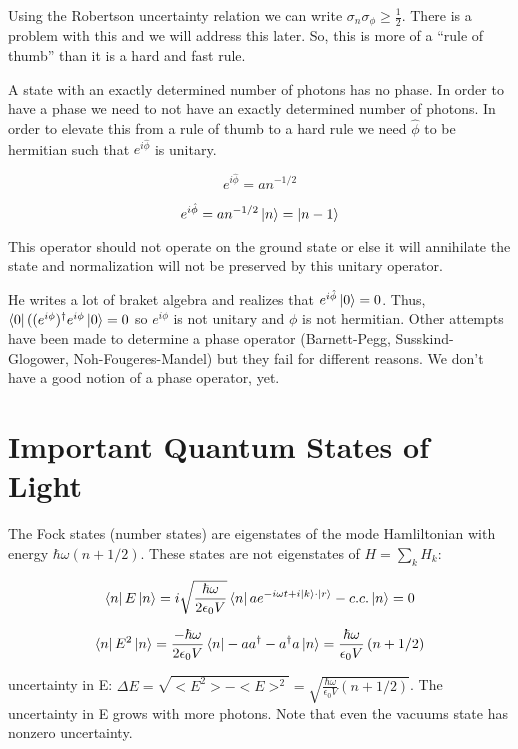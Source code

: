 \documentclass{article}
\begin{document}
Using the Robertson uncertainty relation we can write $\sigma_n \sigma_\phi \ge
\frac{1}{2}$. There is a problem with this and we will address this later. So,
this is more of a ``rule of thumb'' than it is a hard and fast rule.

A state with an exactly determined number of photons has no phase. In order to
have a phase we need to not have an exactly determined number of photons. In
order to elevate this from a rule of thumb to a hard rule we need $\hat{\phi}$
to be hermitian such that $e^{i\hat{\phi}}$ is unitary.

\[ 
    e^{i \hat{\phi}} = a n^{-1/2} 
\]

\[ 
    e^{i \hat{\phi}} = a n^{-1/2} \ket{n} = \ket{n-1} 
\]

This operator should not operate on the ground state or else it will annihilate
the state and normalization will not be preserved by this unitary operator.

He writes a lot of braket algebra and realizes that $e^{i\hat{\phi}} \ket{0} =
0$. Thus, $\bra{0} ((e^{i\phi})^\dagger e^{i \phi} \ket{0} = 0$ so $e^{i\phi}$ is
not unitary and $\phi$ is not hermitian. Other attempts have been made to
determine a phase operator (Barnett-Pegg, Susskind-Glogower,
Noh-Fougeres-Mandel) but they fail for different reasons. We don't have a good
notion of a phase operator, yet.

\section*{Important Quantum States of Light}
The Fock states (number states) are eigenstates of the mode Hamliltonian with
energy $\hbar \omega \left( n + 1/2 \right)$. These states are not eigenstates
of $H = \sum_k H_k$:

\[ 
    \bra{n} E \ket{n} = i \sqrt{\frac{\hbar \omega}{2 \epsilon_0 V}} \bra{n}
    a e^{-i \omega t + i \ket{k}\cdot \ket{r}} - c.c. \ket{n} = 0
\]

\[ 
    \bra{n} E^2 \ket{n} = \frac{- \hbar \omega}{2 \epsilon_0 V} \bra{n} -a
    a^\dagger - a^\dagger a \ket{n} = \frac{\hbar \omega}{\epsilon_0 V} \left( n
    + 1/2 \right)
\]

uncertainty in E: $\Delta E = \sqrt{<E^2> - <E>^2} = \sqrt{\frac{\hbar
\omega}{\epsilon_0 V} \left( n+1/2 \right)}$. The uncertainty in E grows with
more photons. Note that even the vacuums state has nonzero uncertainty.
\end{document}
